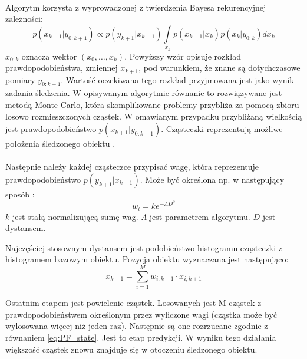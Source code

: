 \paragraph*{}
Algorytm korzysta z wyprowadzonej z twierdzenia Bayesa rekurencyjnej zależności:
\begin{equation}
p(x_{k+1}|y_{0:k+1}) \propto p(y_{k+1}|x_{k+1}) \int\limits_{x_k} p(x_{k+1}|x_k)p(x_k|y_{0:k})dx_k
\end{equation}
\(x_{0:k}\) oznacza wektor \((x_0,\dots,x_k)\).
Powyższy wzór opisuje rozkład prawdopodobieństwa, zmiennej \(x_{k+1}\), pod warunkiem, że znane są dotychczasowe pomiary \(y_{0:k+1}\). Wartość oczekiwana tego rozkład przyjmowana jest jako wynik zadania śledzenia. W opisywanym algorytmie równanie to rozwiązywane jest metodą Monte Carlo, która skomplikowane problemy przybliża za pomocą zbioru losowo rozmieszczonych cząstek. W omawianym przypadku przybliżaną wielkością jest prawdopodobieństwo \(p(x_{k+1}|y_{0:k+1})\). Cząsteczki reprezentują możliwe położenia śledzonego obiektu \cite{Meresinski}.

\paragraph*{}
Następnie należy każdej cząsteczce przypisać wagę, która reprezentuje prawdopodobieństwo \(p(y_{k+1}|x_{k+1})\). Może być określona np. w następujący sposób \cite{Meresinski}:
\begin{equation}
w_i=ke^{-\Lambda D^2}
\end{equation}
\(k\) jest stałą normalizującą sumę wag.
\(\Lambda\) jest parametrem algorytmu.
\(D\) jest dystansem.

Najczęściej stosownym dystansem jest podobieństwo histogramu cząsteczki z histogramem bazowym obiektu. Pozycja obiektu wyznaczana jest następująco:
\begin{equation}
\label{eq:PF_polozenie}
x_{k+1}=\sum\limits_{i=1}^{M} w_{i,k+1} \cdot x_{i,k+1}
\end{equation}

Ostatnim etapem jest powielenie cząstek. Losowanych jest M cząstek z prawdopodobieństwem określonym przez wyliczone wagi (cząstka może być wylosowana więcej niż jeden raz). Następnie są one rozrzucane zgodnie z równaniem \ref{eq:PF_state}. Jest to etap predykcji. W wyniku tego działania większość cząstek znowu znajduje się w otoczeniu śledzonego obiektu.

